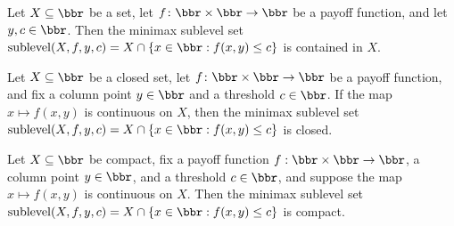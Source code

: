 \begin{lemma}
\label{OnlineLearning.minimaxSublevel_subset}
\leanok
{}
Let $X \subseteq \bbr$ be a set, let $f \colon \bbr \times \bbr \to \bbr$ be a payoff
function, and let $y, c \in \bbr$. Then the minimax sublevel set
$\mathrm{sublevel}(X,f,y,c) = X \cap \{x \in \bbr : f(x,y) \leq c\}$ is contained in
$X$.
\end{lemma}

\begin{lemma}
\label{OnlineLearning.minimaxSublevel_isClosed}
\leanok
{}
Let $X \subseteq \bbr$ be a closed set, let $f\colon \bbr \times \bbr \to \bbr$ be a
payoff function, and fix a column point $y \in \bbr$ and a threshold $c \in \bbr$. If
the map $x \mapsto f(x,y)$ is continuous on $X$, then the minimax sublevel set
$\mathrm{sublevel}(X,f,y,c) = X \cap \{x \in \bbr : f(x,y) \le c\}$ is closed.
\end{lemma}

\begin{lemma}
\label{OnlineLearning.minimaxSublevel_isCompact}
\leanok
{}
Let $X \subseteq \bbr$ be compact, fix a payoff function $f : \bbr \times \bbr \to
\bbr$, a column point $y \in \bbr$, and a threshold $c \in \bbr$, and suppose the map $x
\mapsto f(x,y)$ is continuous on $X$. Then the minimax sublevel set
$\mathrm{sublevel}(X,f,y,c) = X \cap \{x \in \bbr : f(x,y) \le c\}$ is compact.
\end{lemma}


